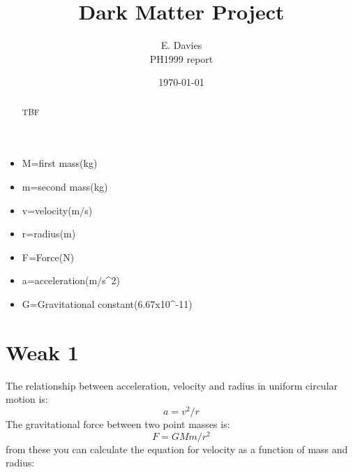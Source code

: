 \documentclass[10pt, twocolumn, twoside]{article}
\author{E. Davies\\PH1999 report}
\title{Dark Matter Project}
\date{\today}
\begin{document}
\maketitle %

\begin{abstract}
TBF
\end{abstract}




\begin{itemize}
  \item M=first mass(kg)
  \item m=second mass(kg)
  \item v=velocity(m/s)
  \item r=radius(m)
  \item F=Force(N)
  \item a=acceleration(m/s^2)
  
  \item G=Gravitational constant(6.67x10^-11)
\end{itemize}


\section{Weak 1}
The relationship between acceleration, velocity and radius in uniform circular motion is:
\label{GaussE}
\begin{equation}
a=v^2/r
\end{equation}
The gravitational force between two point masses is:
\begin{equation}
\label{GaussE}
F=GMm/r^2
\end{equation}
from these you can calculate the equation for velocity as a function of mass and radius:
\end{document}

